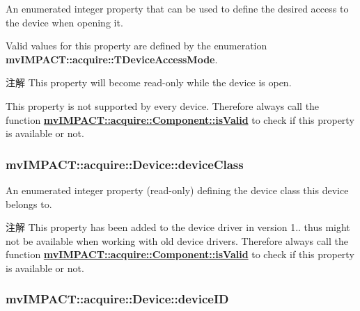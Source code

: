 An enumerated integer property that can be used to define the desired access to the device when opening it. 

Valid values for this property are defined by the enumeration {\bfseries mv\+I\+M\+P\+A\+C\+T\+::acquire\+::\+T\+Device\+Access\+Mode}.

\begin{DoxyNote}{注解}
This property will become read-\/only while the device is open.

This property is not supported by every device. Therefore always call the function {\bfseries \hyperlink{classmv_i_m_p_a_c_t_1_1acquire_1_1_component_ac51e55e7e046101f3c6119d84123abd5}{mv\+I\+M\+P\+A\+C\+T\+::acquire\+::\+Component\+::is\+Valid}} to check if this property is available or not. 
\end{DoxyNote}
\hypertarget{classmv_i_m_p_a_c_t_1_1acquire_1_1_device_a3cc7db9051fa3ebe73a8f38a274dad19}{
\subsubsection[{device\+Class}]{ mv\+I\+M\+P\+A\+C\+T\+::acquire\+::\+Device\+::device\+Class}}\label{classmv_i_m_p_a_c_t_1_1acquire_1_1_device_a3cc7db9051fa3ebe73a8f38a274dad19}


An enumerated integer property {\bfseries }(read-\/only) defining the device class this device belongs to. 

\begin{DoxyNote}{注解}
This property has been added to the device driver in version 1.. thus might not be available when working with old device drivers. Therefore always call the function {\bfseries \hyperlink{classmv_i_m_p_a_c_t_1_1acquire_1_1_component_ac51e55e7e046101f3c6119d84123abd5}{mv\+I\+M\+P\+A\+C\+T\+::acquire\+::\+Component\+::is\+Valid}} to check if this property is available or not. 
\end{DoxyNote}
\hypertarget{classmv_i_m_p_a_c_t_1_1acquire_1_1_device_a239e7c6f214d441015ef15e4cbde83ca}{
\subsubsection[{device\+I\+D}]{ mv\+I\+M\+P\+A\+C\+T\+::acquire\+::\+Device\+::device\+I\+D}}\label{classmv_i_m_p_a_c_t_1_1acquire_1_1_device_a239e7c6f214d441015ef15e4cbde83ca}


